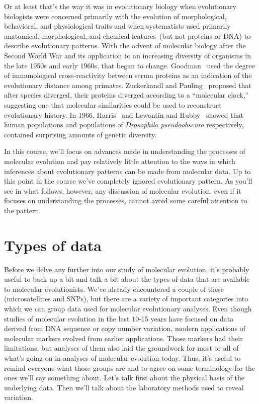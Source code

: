 \documentclass[12pt]{article}
\begin{document}
Or at least that's the way it was in evolutionary biology when
evolutionary biologists were concerned primarily with the evolution of
morphological, behavioral, and physiological traits and when
systematists used primarily anatomical, morphological, and chemical
features~(but not proteins or DNA) to describe evolutionary
patterns. With the advent of molecular biology after the Second World
War and its application to an increasing diversity of organisms in the
late 1950s and early 1960s, that began to
change. Goodman~\cite{Goodman62} used the degree of immunological
cross-reactivity between serum proteins as an indication of the
evolutionary distance among primates. Zuckerkandl and
Pauling~\cite{Zuckerkandl-Pauling65} proposed that after species
diverged, their proteins diverged according to a ``molecular clock,''
suggesting one that molecular similarities could be used to
reconstruct evolutionary history. In 1966, Harris~\cite{Harris66} and
Lewontin and Hubby~\cite{Hubby-Lewontin66,Lewontin-Hubby66} showed
that human populations and populations of {\it Drosophila
  pseudoobscura\/} respectively, contained surprising amounts of
genetic diversity.

In this course, we'll focus on advances made in understanding the
processes of molecular evolution and pay relatively little attention
to the ways in which inferences about evolutionary patterns can be
made from molecular data. Up to this point in the course we've
completely ignored evolutionary pattern. As you'll see in what
follows, however, any discussion of molecular evolution, even if it
focuses on understanding the processes, cannot avoid some careful
attention to the pattern.

\section*{Types of data}

Before we delve any further into our study of molecular evolution,
it's probably useful to back up a bit and talk a bit about the types
of data that are available to molecular evolutionists. We've already
encountered a couple of these (microsatellites and SNPs), but there
are a variety of important categories into which we can group data
used for molecular evolutionary analyses. Even though studies of
molecular evolution in the last 10-15 years have focused on data
derived from DNA sequence or copy number variation, modern
applications of molecular markers evolved from earlier
applications. Those markers had their limitations, but analyses of
them also laid the groundwork for most or all of what's going on in
analyses of molecular evolution today. Thus, it's useful to remind
everyone what those groups are and to agree on some terminology for
the ones we'll say something about. Let's talk first about the
physical basis of the underlying data. Then we'll talk about the
laboratory methods used to reveal variation.
\end{document}
